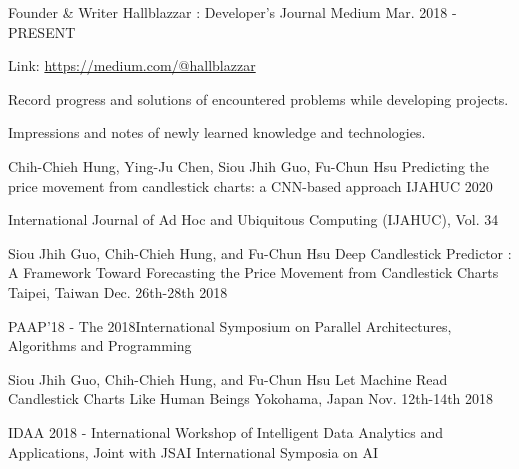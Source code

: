 

\begin{cventries}

    \cventry
        {Founder \& Writer} %
        {Hallblazzar : Developer's Journal} %
        {Medium} %
        {Mar. 2018 - PRESENT} %
        {
          \begin{cvitems} %
            \item {Link: \href{https://medium.com/@hallblazzar}{https://medium.com/@hallblazzar}}
            \item {Record progress and solutions of encountered problems while developing projects.} 
            \item {Impressions and notes of newly learned knowledge and technologies.}
          \end{cvitems}
        }

    \cventry
        {Chih-Chieh Hung, Ying-Ju Chen, Siou Jhih Guo, Fu-Chun Hsu}
        {Predicting the price movement from candlestick charts: a CNN-based approach}
        {IJAHUC}
        {2020}
        {
            \begin{cvitems}
                \item {International Journal of Ad Hoc and Ubiquitous Computing (IJAHUC), Vol. 34}
            \end{cvitems}
        }

    \cventry
        {Siou Jhih Guo, Chih-Chieh Hung, and Fu-Chun Hsu}
        {Deep Candlestick Predictor : A Framework Toward Forecasting the Price Movement from Candlestick Charts}
        {Taipei, Taiwan}
        {Dec. 26th-28th 2018}
        {
            \begin{cvitems}
                \item {PAAP’18 - The 2018International Symposium on Parallel Architectures, Algorithms and Programming}
            \end{cvitems}
        }

    \cventry
        {Siou Jhih Guo, Chih-Chieh Hung, and Fu-Chun Hsu}
        {Let Machine Read Candlestick Charts Like Human Beings}
        {Yokohama, Japan}
        {Nov. 12th-14th 2018}
        {
            \begin{cvitems}
                \item {IDAA 2018 - International Workshop of Intelligent Data Analytics and Applications, Joint with JSAI International Symposia on AI}
            \end{cvitems}
        }
        
\end{cventries}

